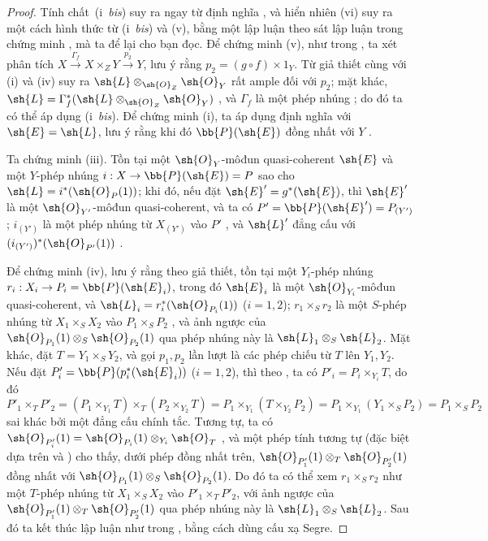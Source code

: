 \documentclass[oneside,10pt]{amsart}
\makeatletter
\newcommand{\ega@arrow}[2]{\mathchoice{#1}{#2}{#2}{#2}}
\renewcommand{\to}{\ega@arrow{\longrightarrow}{\rightarrow}}
\newcommand{\oldpage}[2][]{\marginnote{\normalfont\footnotesize\textbf{#1}~|~#2}\ignorespaces}
\makeatother
\begin{document}
\begin{proof}
Tính chất~(i~\emph{bis}) suy ra ngay từ định nghĩa , và hiển nhiên (vi) suy ra một cách hình thức từ (i~\emph{bis}) và (v), bằng một lập luận theo sát lập luận trong chứng minh , mà ta để lại cho bạn đọc.
Để chứng minh (v), như trong , ta xét phân tích $X\xrightarrow{\Gamma_f}X\times_Z Y\xrightarrow{p_2}Y$, lưu ý rằng $p_2=(g\circ f)\times1_Y$.
Từ giả thiết cùng với (i) và (iv) suy ra $\sh{L}\otimes_{\sh{O}_Z}\sh{O}_Y$ rất ample đối với $p_2$;
mặt khác, $\sh{L}=\Gamma_f^*(\sh{L}\otimes_{\sh{O}_Z}\sh{O}_Y)$ , và $\Gamma_f$ là một phép nhúng ;
do đó ta có thể áp dụng (i~\emph{bis}).
\oldpage[II]{82}
Để chứng minh (i), ta áp dụng định nghĩa  với $\sh{E}=\sh{L}$, lưu ý rằng khi đó $\bb{P}(\sh{E})$ đồng nhất với $Y$ .

Ta chứng minh (iii).
Tồn tại một $\sh{O}_Y$-môđun quasi-coherent $\sh{E}$ và một $Y$-phép nhúng $i:X\to\bb{P}(\sh{E})=P$ sao cho $\sh{L}=i^*(\sh{O}_P(1))$;
khi đó, nếu đặt $\sh{E}'=g^*(\sh{E})$, thì $\sh{E}'$ là một $\sh{O}_{Y'}$-môđun quasi-coherent, và ta có $P'=\bb{P}(\sh{E}')=P_{(Y')}$ ; $i_{(Y')}$ là một phép nhúng từ $X_{(Y')}$ vào $P'$ , và $\sh{L}'$ đẳng cấu với $(i_{(Y')})^*(\sh{O}_{P'}(1))$ .

Để chứng minh (iv), lưu ý rằng theo giả thiết, tồn tại một $Y_i$-phép nhúng $r_i:X_i\to P_i=\bb{P}(\sh{E}_i)$, trong đó $\sh{E}_i$ là một $\sh{O}_{Y_i}$-môđun quasi-coherent, và $\sh{L}_i=r_i^*(\sh{O}_{P_i}(1))$ ($i=1,2$);
$r_1\times_S r_2$ là một $S$-phép nhúng từ $X_1\times_S X_2$ vào $P_1\times_S P_2$ , và ảnh ngược của $\sh{O}_{P_1}(1)\otimes_S\sh{O}_{P_2}(1)$ qua phép nhúng này là $\sh{L}_1\otimes_S\sh{L}_2$.
Mặt khác, đặt $T=Y_1\times_S Y_2$, và gọi $p_1,p_2$ lần lượt là các phép chiếu từ $T$ lên $Y_1,Y_2$.
Nếu đặt $P'_i=\bb{P}(p_i^*(\sh{E}_i))$ ($i=1,2$), thì theo , ta có $P'_i=P_i\times_{Y_i}T$, do đó
\[
  P'_1\times_T P'_2
  =(P_1\times_{Y_1}T)\times_T(P_2\times_{Y_2}T)
  =P_1\times_{Y_1}(T\times_{Y_2}P_2)
  =P_1\times_{Y_1}(Y_1\times_S P_2)
  =P_1\times_S P_2
\]
sai khác bởi một đẳng cấu chính tắc.
Tương tự, ta có $\sh{O}_{P'_i}(1)=\sh{O}_{P_i}(1)\otimes_{Y_i}\sh{O}_T$ , và một phép tính tương tự (đặc biệt dựa trên  và ) cho thấy, dưới phép đồng nhất trên, $\sh{O}_{P'_1}(1)\otimes_T\sh{O}_{P'_2}(1)$ đồng nhất với $\sh{O}_{P_1}(1)\otimes_S\sh{O}_{P_2}(1)$.
Do đó ta có thể xem $r_1\times_S r_2$ như một $T$-phép nhúng từ $X_1\times_S X_2$ vào $P'_1\times_T P'_2$, với ảnh ngược của $\sh{O}_{P'_1}(1)\otimes_T\sh{O}_{P'_2}(1)$ qua phép nhúng này là $\sh{L}_1\otimes_S\sh{L}_2$.
Sau đó ta kết thúc lập luận như trong , bằng cách dùng cấu xạ Segre.


\end{proof}
\end{document}
